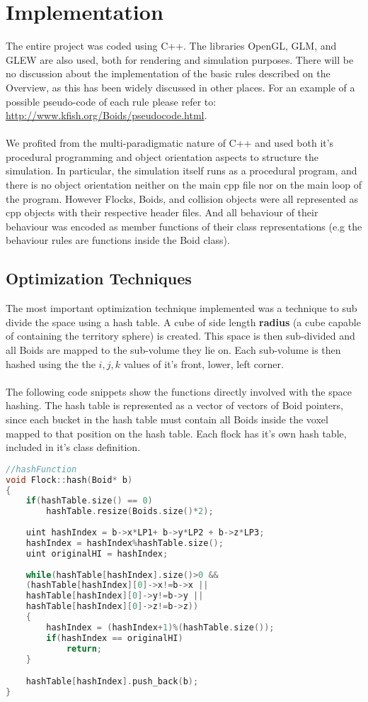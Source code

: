 \documentclass[12pt]{article}
\begin{document}
\section{Implementation}
The entire project was coded using C++. The libraries OpenGL, GLM, and GLEW are also used, both for rendering and simulation purposes. There will be no discussion about the implementation of the basic rules described on the Overview, as this has been widely discussed in other places. For an example of a possible pseudo-code of each rule please refer to: \url{http://www.kfish.org/Boids/pseudocode.html}.
\\ \\
We profited from the multi-paradigmatic nature of C++ and used both it's procedural programming and object orientation aspects to structure the simulation. In particular, the simulation itself runs as a procedural program, and there is no object orientation neither on the main cpp file nor on the main loop of the program. However Flocks, Boids, and collision objects were all represented as cpp objects with their respective header files. And all behaviour of their behaviour was encoded as member functions of their class representations (e.g the behaviour rules are functions inside the Boid class). 

\subsection{Optimization Techniques}
The most important optimization technique implemented was a technique to sub divide the space using a hash table. A cube of side length \textbf{radius} (a cube capable of containing the territory sphere) is created. This space is then sub-divided and all Boids are mapped to the sub-volume they lie on. Each sub-volume is then hashed using the the $i,j,k$ values of it's front, lower, left corner.
\\ \\
\noindent The following code snippets show the functions directly involved with the space hashing. The hash table is represented as a vector of vectors of Boid pointers, since each bucket in the hash table must contain all Boids inside the voxel mapped to that position on the hash table. Each flock has it's own hash table, included in it's class definition.

\begin{minipage}[t]{\textwidth}
\begin{lstlisting}[language=C++]
//hashFunction
void Flock::hash(Boid* b)
{
	if(hashTable.size() == 0)
		hashTable.resize(Boids.size()*2);
	
	uint hashIndex = b->x*LP1+ b->y*LP2 + b->z*LP3;
	hashIndex = hashIndex%hashTable.size();
	uint originalHI = hashIndex;
	
	while(hashTable[hashIndex].size()>0 &&
	(hashTable[hashIndex][0]->x!=b->x ||
	hashTable[hashIndex][0]->y!=b->y ||
	hashTable[hashIndex][0]->z!=b->z))
	{
		hashIndex = (hashIndex+1)%(hashTable.size());
		if(hashIndex == originalHI)
			return;
	}

	hashTable[hashIndex].push_back(b);
}
\end{lstlisting}
\end{minipage}
\end{document}
